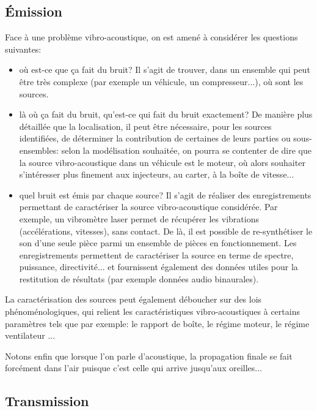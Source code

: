 \medskip
\subsection{Émission}

Face à une problème vibro-acoustique, on est amené à considérer les questions suivantes:
\begin{itemize}
   \item {} où est-ce que ça fait du bruit? Il s'agit de trouver, dans un ensemble qui peut être très complexe (par exemple un véhicule, un compresseur...), où sont les sources.
   \item {} là où ça fait du bruit, qu’est-ce qui fait du bruit exactement? De manière plus détaillée que la localisation, il peut être nécessaire, pour les sources identifiées, de déterminer la contribution de certaines de leurs parties ou sous-ensembles: selon la modélisation souhaitée, on pourra se contenter de dire que la source vibro-acoustique dans un véhicule est le moteur, où alors souhaiter s'intéresser plus finement aux injecteurs, au carter, à la boîte de vitesse...
   \item {} quel bruit est émis par chaque source? Il s'agit de réaliser des enregistrements permettant de caractériser la source vibro-acoustique considérée. Par exemple, un vibromètre laser permet de récupérer les vibrations (accélérations, vitesses), sans contact. De là, il est possible de re-synthétiser le son d'une seule pièce parmi un ensemble de pièces en fonctionnement. Les enregistrements permettent de caractériser la source en terme de spectre, puissance, directivité... et fournissent également des données utiles pour la restitution de résultats (par exemple données audio binaurales).
\end{itemize}

\medskip
La caractérisation des sources peut également déboucher sur des lois phénoménologiques, qui relient les caractéristiques vibro-acoustiques à certains paramètres tels que par exemple: le rapport de boîte, le régime moteur, le régime ventilateur \cite{bib-Sandberg,bib-Sandberg2,bib-HametPoster,bib-Hamet,bib-Lucquiaud,bib-Lebrun,bib-Favre,bib-Steven}...

\medskip
Notons enfin que lorsque l'on parle d'acoustique, la propagation finale se fait forcément dans l'air puisque c'est celle qui arrive jusqu'aux oreilles...

\medskip
\subsection{Transmission}

